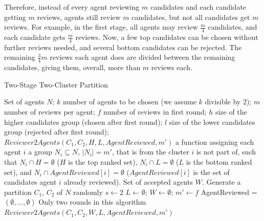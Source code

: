 \documentclass[letterpaper]{article} %
\begin{document}
Therefore, instead of every agent reviewing $m$ candidates and each candidate getting $m$ reviews, agents still review $m$ candidates, but not all candidates get $m$ reviews. For example, in the first stage, all agents may review $\frac{m}{4}$ candidates, and each candidate gets $\frac{m}{4}$ reviews. Now, a few top candidates can be chosen without further reviews needed, and several bottom candidates can be rejected. The remaining $\frac{3}{4}m$ reviews each agent does are divided between the remaining candidates, giving them, overall, more than $m$ reviews each.

\begin{algorithm}[t]
\small
\caption{Two-Stage Two-Cluster Partition}\label{2StagePartition}
\begin{algorithmic}[1]
\Require
Set of agents $N$; %
\newline
$k$ number of agents to be chosen (we assume $k$ divisible by 2); 
\newline
$m$ number of reviews per agent;
\newline
$f$ number of reviews in first round;
\newline
$h$ size of the higher candidates group (chosen after first round);
\newline
$l$ size of the lower candidates group (rejected after first round); 
\newline
$Reviewer2Agents(C_{1},C_{2},H,L,AgentReviewed,m')$ a function assigning each agent $i$ a group $N_{i}\subseteq N$, $|N_{i}|=m'$, that is from the cluster $i$ is not part of, such that $N_{i}\cap H=\emptyset$ ($H$ is the top ranked set), $N_{i}\cap L=\emptyset$ ($L$ is the bottom ranked set), and $N_{i}\cap AgentReviewed[i]=\emptyset$ ($AgentReviewed[i]$ is the set of candidates agent $i$ already reviewed).
\newline
\Ensure Set of accepted agents $W$.
\State Generate a partition {$C_{1}$, $C_{2}$} of $N$ randomly
\State $s \gets 2$ 
\State $L \gets \emptyset$; 
\State $W \gets \emptyset$; 
\State $m' \gets f$ 
\State AgentReviewed = $(\emptyset , \ldots , \emptyset)$
 \Comment Only two rounds in this algorithm
 \State $Reviewer2Agents(C_{1},C_{2},W,L,AgentReviewed,m')$
 

\end{algorithmic}
\end{algorithm}
\end{document}
